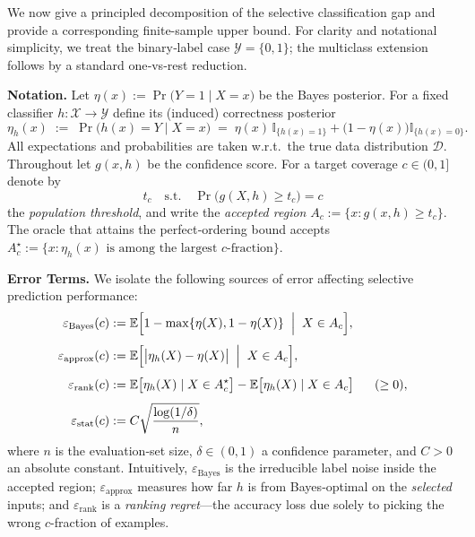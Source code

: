 We now give a principled decomposition of the selective classification gap and provide a corresponding finite-sample upper bound. For clarity and notational simplicity, we treat the binary‑label case \(\mathcal{Y}=\{0,1\}\); the multiclass extension follows by a standard one‑vs‑rest reduction.

\textbf{Notation.} Let \(\eta(x):=\Pr\bigl(Y=1\mid X=x\bigr)\) be the Bayes posterior.
For a fixed classifier \(h:\mathcal{X}\to\mathcal{Y}\) define its
(induced) correctness posterior
\begin{equation}
  \eta_h(x)\;:=\;\Pr\bigl(h(x)=Y\mid X=x\bigr)
  \;=\;\eta(x)\,\mathbb{I}_{\{h(x)=1\}}+
        \bigl(1-\eta(x)\bigr)\mathbb{I}_{\{h(x)=0\}}.
\end{equation}
All expectations and probabilities are taken w.r.t.\ the true data distribution
\(\mathcal{D}\). Throughout let \(g(x,h)\) be the confidence score.
For a target coverage \(c\in(0,1]\) denote by
\begin{equation}
  t_c \quad \text{s.t.}\quad
  \Pr\bigl(g(X,h)\ge t_c\bigr)=c
\end{equation}
the \emph{population threshold}, and write the
\emph{accepted region}
\(A_c:=\{x:g(x,h)\ge t_c\}\).  
The oracle that attains the perfect‑ordering bound accepts $A_c^{\star}:=\bigl\{x:\eta_h(x)\text{ is among the largest }c\text{-fraction}\bigr\}$.

\textbf{Error Terms.} We isolate the following sources of error affecting selective prediction performance:
\begin{align}
\varepsilon_{\text{Bayes}}(c)
&:=\mathbb{E}\Bigl[1-\max\{\eta(X),1-\eta(X)\}\;\Bigm|\;X\in A_c\Bigr],
\\[4pt]
\varepsilon_{\text{approx}}(c)
&:=\mathbb{E}\Bigl[\bigl|\eta_h(X)-\eta(X)\bigr|\;\Bigm|\;X\in A_c\Bigr],
\\[4pt]
\varepsilon_{\text{rank}}(c)
&:=\mathbb{E}\bigl[\eta_h(X)\mid X\in A_c^{\star}\bigr]
  -\mathbb{E}\bigl[\eta_h(X)\mid X\in A_c\bigr]\;\;\;\;\;\;(\ge0),
\\[4pt]
\varepsilon_{\text{stat}}(c)
&:=C\sqrt{\frac{\log(1/\delta)}{n}},
\end{align}
where \(n\) is the evaluation‑set size, \(\delta\in(0,1)\) a confidence
parameter, and \(C>0\) an absolute constant. Intuitively, \(\varepsilon_{\text{Bayes}}\) is the irreducible label noise inside the accepted region; \(\varepsilon_{\text{approx}}\) measures how far \(h\) is from Bayes‑optimal on the \emph{selected} inputs; and \(\varepsilon_{\text{rank}}\) is a \emph{ranking regret}—the accuracy loss due solely to picking the wrong \(c\)-fraction of examples.

